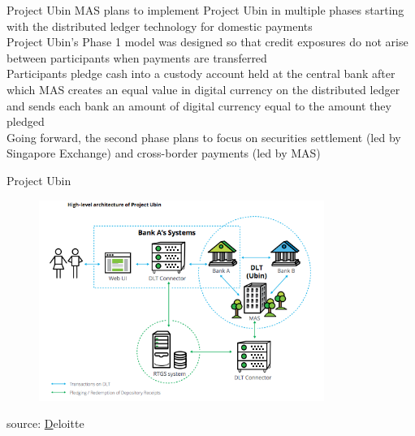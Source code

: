 \documentclass[10pt]{beamer}
\begin{document}
\begin{frame}{Project Ubin}
	MAS plans to implement Project Ubin in multiple phases starting with the distributed ledger technology for domestic payments\\ \vspace{3mm}
	Project Ubin's Phase 1 model was designed so that credit exposures do not arise between participants when payments are transferred\\ \vspace{3mm}
	Participants pledge cash into a custody account held at the central bank after which MAS creates an equal value in digital currency on the distributed ledger and sends each bank an amount of digital currency equal to the amount they pledged\\ \vspace{3mm}
	Going forward, the second phase plans to focus on securities settlement (led by Singapore Exchange) and cross-border payments (led by MAS)
\end{frame}



\begin{frame}{Project Ubin}
	\begin{figure}[]
		\centering
		\includegraphics  [width=93mm]{Images/ubin}
	\end{figure}
	\begin{scriptsize}
		source: \href{http://www.mas.gov.sg/~/media/ProjectUbin/Project\%20Ubin\%20\%20SGD\%20on\%20Distributed\%20Ledger.pdf}Deloitte
	\end{scriptsize}
\end{frame}
\end{document}
